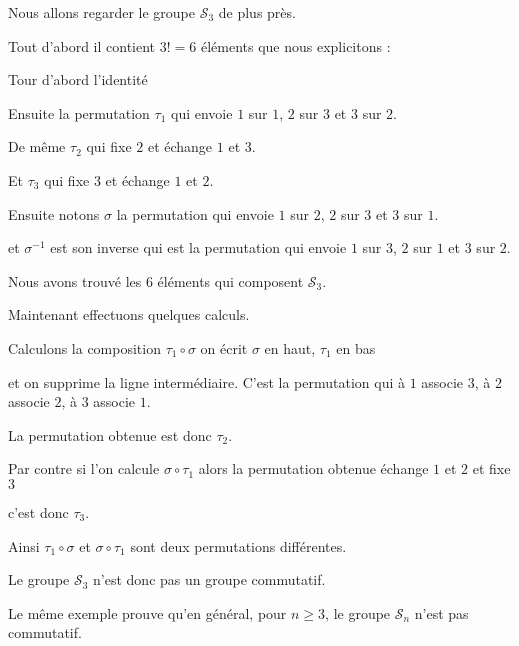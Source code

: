 Nous allons regarder le groupe $\mathcal{S}_3$ de plus près.

Tout d'abord il contient $3!=6$ éléments que nous explicitons :

\change

Tour d'abord l'identité

\change

Ensuite la permutation $\tau_1$ qui envoie $1$ sur $1$,
$2$ sur $3$ et $3$ sur $2$.

\change

De même $\tau_2$ qui fixe $2$ et échange $1$ et $3$.

\change

Et $\tau_3$ qui fixe $3$ et échange $1$ et $2$.

\change

Ensuite notons $\sigma$ la permutation qui envoie $1$ sur $2$,
$2$ sur $3$ et $3$ sur $1$.

\change

et $\sigma^{-1}$ est son inverse qui est la permutation qui envoie $1$ sur $3$,
$2$ sur $1$ et $3$ sur $2$.

\change

Nous avons trouvé les $6$ éléments qui composent $\mathcal{S}_3$.

Maintenant effectuons quelques calculs.

\change

Calculons la composition $\tau_1\circ \sigma$ on écrit $\sigma$ en haut, $\tau_1$ en bas

\change

et on supprime la ligne intermédiaire. 
C'est la permutation qui à $1$ associe $3$,
à $2$ associe $2$, à $3$ associe $1$.

\change

La permutation obtenue est donc $\tau_2$.

\change

Par contre si l'on calcule $\sigma \circ \tau_1$ alors 
la permutation obtenue échange $1$ et $2$ et fixe $3$

\change

c'est donc $\tau_3$.

Ainsi $\tau_1\circ \sigma$ et $\sigma \circ \tau_1$ sont deux permutations différentes.

Le groupe $\mathcal{S}_3$ n'est donc pas un groupe commutatif.

\change

Le même exemple prouve qu'en général, pour $n\ge 3$,
le groupe $\mathcal{S}_n$ n'est pas commutatif.


